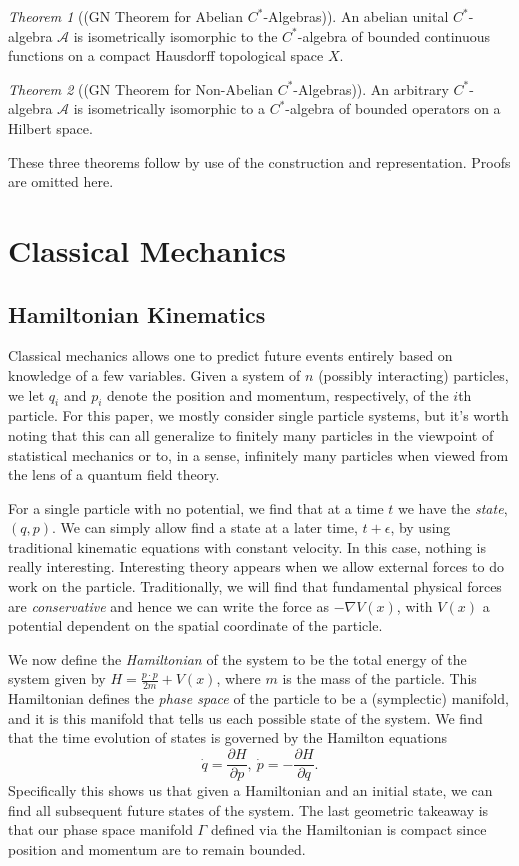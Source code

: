 \documentclass[leqno]{article}
\theoremstyle{definition}
\theoremstyle{remark}
\theoremstyle{theorem}
\newtheorem{theorem}{Theorem}[section]
\newcommand{\A}{\mathcal{A}}
\begin{document}
\begin{theorem}[(GN Theorem for Abelian $C^*$-Algebras)]
An abelian unital $C^*$-algebra $\A$ is isometrically isomorphic to the $C^*$-algebra of bounded continuous functions on a compact Hausdorff topological space $X$. 
\end{theorem}

\begin{theorem}[(GN Theorem for Non-Abelian $C^*$-Algebras)]
An arbitrary $C^*$-algebra $\A$ is isometrically isomorphic to a $C^*$-algebra of bounded operators on a Hilbert space.
\end{theorem}

These three theorems follow by use of the construction and representation.  Proofs are omitted here.

\section{Classical Mechanics}
\subsection{Hamiltonian Kinematics}
Classical mechanics allows one to predict future events entirely based on knowledge of a few variables.  Given a system of $n$ (possibly interacting) particles, we let $q_i$ and $p_i$ denote the position and momentum, respectively, of the $i$th particle.  For this paper, we mostly consider single particle systems, but it's worth noting that this can all generalize to finitely many particles in the viewpoint of statistical mechanics or to, in a sense, infinitely many particles when viewed from the lens of a quantum field theory.

For a single particle with no potential, we find that at a time $t$ we have the \emph{state}, $(q,p)$.  We can simply allow find a state at a later time, $t+\epsilon$, by using traditional kinematic equations with constant velocity. In this case, nothing is really interesting.  Interesting theory appears when we allow external forces to do work on the particle.  Traditionally, we will find that fundamental physical forces are \emph{conservative} and hence we can write the force as $-\nabla V(x)$, with $V(x)$ a potential dependent on the spatial coordinate of the particle.  

We now define the \emph{Hamiltonian} of the system to be the total energy of the system given by $H=\frac{p\cdot p}{2m} + V(x)$, where $m$ is the mass of the particle. This Hamiltonian defines the \emph{phase space} of the particle to be a (symplectic) manifold, and it is this manifold that tells us each possible state of the system.  We find that the time evolution of states is governed by the Hamilton equations
\[
\dot{q}=\frac{\partial H}{\partial p}, ~ \dot{p}=-\frac{\partial H}{\partial q}.
\]
Specifically this shows us that given a Hamiltonian and an initial state, we can find all subsequent future states of the system. The last geometric takeaway is that our phase space manifold $\Gamma$ defined via the Hamiltonian is compact since position and momentum are to remain bounded.
\end{document}
